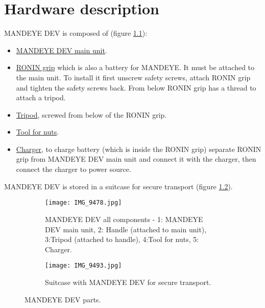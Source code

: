 \chapter{Hardware description}
MANDEYE DEV is composed of (figure \ref{fig:m11}):
\begin{itemize}
	\item \underline{MANDEYE DEV main unit}.
	\item \underline{RONIN grip} which is also a battery for MANDEYE. It must be attached to the main unit. To install it first unscrew safety screws, attach RONIN grip and tighten the safety screws back. From below RONIN grip has a thread to attach a tripod.
	\item \underline{Tripod}, screwed from below of the RONIN grip.
	\item \underline{Tool for nuts}.
	\item \underline{Charger}, to charge battery (which is inside the RONIN grip) separate RONIN grip from MANDEYE DEV main unit and connect it with the charger, then connect the charger to power source.
\end{itemize}
MANDEYE DEV is stored in a suitcase for secure transport (figure \ref{fig:m12}).
\newpage
\begin{figure}[H]
	\centering
	\begin{subfigure}[b]{0.7\textwidth}
		\centering
		\texttt{[image: IMG\_9478.jpg]}
		\caption{MANDEYE DEV all components - 1: MANDEYE DEV main unit, 2: Handle (attached to main unit), 3:Tripod (attached to handle), 4:Tool for nuts, 5: Charger.}
		\label{fig:m11}
	\end{subfigure}
	\hfill
	\begin{subfigure}[b]{0.7\textwidth}
		\centering
		\texttt{[image: IMG\_9493.jpg]}
		\caption{Suitcase with MANDEYE DEV for secure transport.}
		\label{fig:m12}
	\end{subfigure}
	\caption{MANDEYE DEV parts.}
	\label{fig:mandeye_hardware}
\end{figure}

